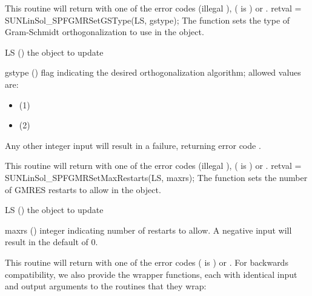 {
  This routine will return with one of the error codes
   (illegal ), 
  ( is ) or .
}
{
}
{
  retval = SUNLinSol\_SPFGMRSetGSType(LS, gstype);
}
{
  The function  sets the type of
  Gram-Schmidt orthogonalization to use in the {\sunlinsolspfgmr}
  object.
}
{
  \begin{args}[gstype]
  \item[LS] ()
    the {\sunlinsolspfgmr} object to update
  \item[gstype] ()
    flag indicating the desired orthogonalization algorithm; allowed
    values are:
    \begin{itemize}
    \item {} (1)
    \item {} (2)
    \end{itemize}
    Any other integer input will result in a
    failure, returning error code .
  \end{args}
}
{
  This routine will return with one of the error codes
   (illegal ), 
  ( is ) or .
}
{
}
{
  retval = SUNLinSol\_SPFGMRSetMaxRestarts(LS, maxrs);
}
{
  The function  sets the number of
  GMRES restarts to allow in the {\sunlinsolspfgmr} object.
}
{
  \begin{args}[maxrs]
  \item[LS] ()
    the {\sunlinsolspfgmr} object to update
  \item[maxrs] ()
    integer indicating number of restarts to allow.  A negative input
    will result in the default of 0.
  \end{args}
}
{
  This routine will return with one of the error codes
   ( is ) or .
}
{
}
For backwards compatibility, we also provide the wrapper functions,
each with identical input and output arguments to the routines that
they wrap:
